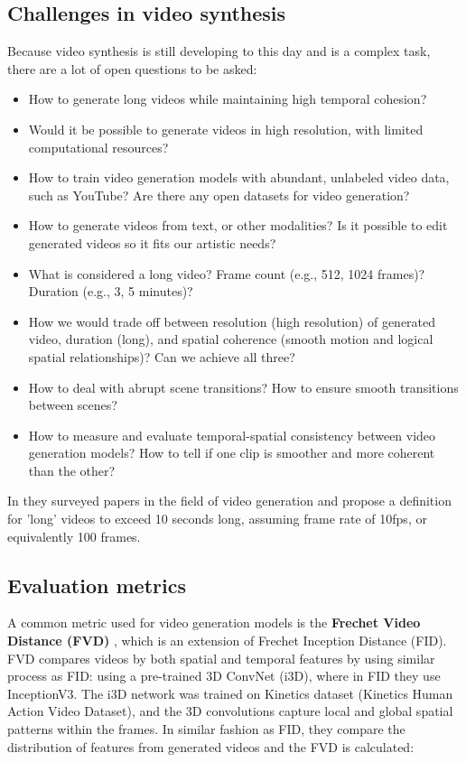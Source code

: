 \subsection*{Challenges in video synthesis}

Because video synthesis is still developing to this day and is a complex task, there are a lot of open questions to be asked:

\begin{itemize}
    \item How to generate long videos while maintaining high temporal cohesion?
    \item Would it be possible to generate videos in high resolution, with limited computational resources?
    \item How to train video generation models with abundant, unlabeled video data, such as YouTube? Are there any open datasets for video generation?
    \item How to generate videos from text, or other modalities? Is it possible to edit generated videos so it fits our artistic needs?
    \item What is considered a long video? Frame count (e.g., 512, 1024 frames)? Duration (e.g., 3, 5 minutes)?
    \item How we would trade off between resolution (high resolution) of generated video, duration (long), and spatial coherence (smooth motion and logical spatial relationships)? Can we achieve all three?
    \item How to deal with abrupt scene transitions? How to ensure smooth transitions between scenes?
    \item How to measure and evaluate temporal-spatial consistency between video generation models? How to tell if one clip is smoother and more coherent than the other?
\end{itemize}

In \cite{long_video_survey} they surveyed papers in the field of video generation and propose a definition for 'long' videos to exceed 10 seconds long, assuming frame rate of 10fps, or equivalently 100 frames.

\subsection{Evaluation metrics}

A common metric used for video generation models is the \textbf{Frechet Video Distance (FVD)} \cite{fvd}, which is an extension of Frechet Inception Distance (FID). FVD compares videos by both spatial and temporal features by using similar process as FID: using a pre-trained 3D ConvNet (i3D), where in FID they use InceptionV3. The i3D network was trained on Kinetics dataset (Kinetics Human Action Video Dataset), and the 3D convolutions capture local and global spatial patterns within the frames. In similar fashion as FID, they compare the distribution of features from generated videos and the FVD is calculated:

